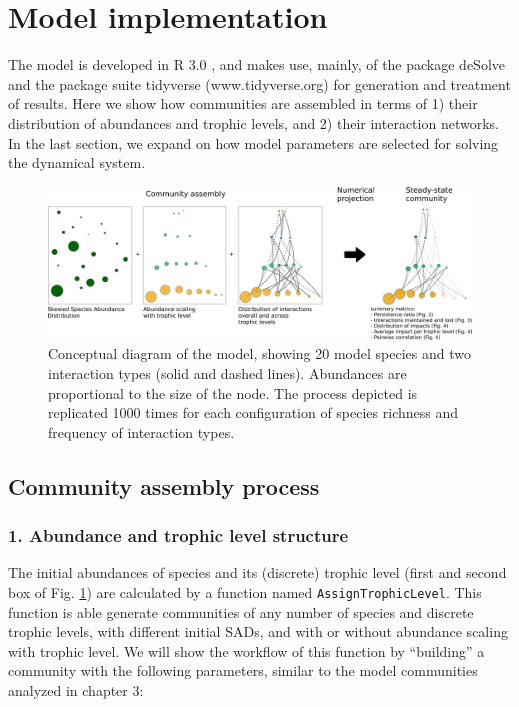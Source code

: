 \section*{Model implementation}\label{model-implementation}

The model is developed in R 3.0 \citep{RCoreTeam2018}, and makes use, mainly, of the package deSolve \citep{Soetaert2012} and the package suite tidyverse (www.tidyverse.org) for generation and treatment of results. Here we show how communities are assembled in terms of 1) their distribution of abundances and trophic levels, and 2) their interaction networks. In the last section, we expand on how model parameters are selected for solving the dynamical system.

\begin{figure}[ht]
\centering
\includegraphics[width=\textwidth]{./Figures/Appendix3_1/Fig_1.png}
\caption[Model diagram]{\color{Gray} Conceptual diagram of the model, showing 20 model species and two interaction types (solid and dashed lines). Abundances are proportional to the size of the node. The process depicted is replicated 1000 times for each configuration of species richness and frequency of interaction types.}
\label{fig:figApp3.1.1}
\end{figure}

\subsection*{Community assembly process}\label{community-assembly-process}

\subsubsection*{1. Abundance and trophic level structure}\label{abundance-and-trophic-level-structure}

The initial abundances of species and its (discrete) trophic level (first and second box of Fig. \ref{fig:figApp3.1.1}) are calculated by a function named \texttt{AssignTrophicLevel}. This function is able generate communities of any number of species and discrete trophic levels, with different initial SADs, and with or without abundance scaling with trophic level. We will show the workflow of this function by ``building'' a community with the following parameters, similar to the model communities analyzed in chapter 3:\\

